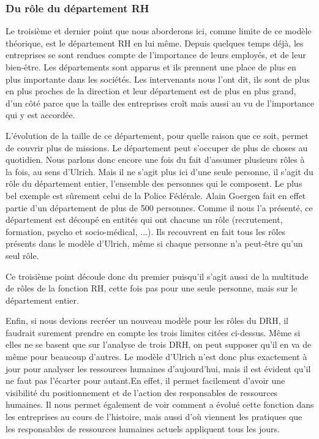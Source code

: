 \subsubsection*{Du rôle du département RH}

Le troisième et dernier point que nous aborderons ici, comme limite de ce modèle théorique, est le département RH en lui même. Depuis quelques temps déjà, les entreprises se sont rendues compte de l'importance de leurs employés, et de leur bien-être. Les départements sont apparus et ils prennent une place de plus en plus importante dans les sociétés. Les intervenants nous l'ont dit, ils sont de plus en plus proches de la direction et leur département est de plus en plus grand, d'un côté parce que la taille des entreprises croît mais aussi au vu de l'importance qui y est accordée. \newline
{}

L'évolution de la taille de ce département, pour quelle raison que ce soit, permet de couvrir plus de missions. Le département peut s'occuper de plus de choses au quotidien. Nous parlons donc encore une fois du fait d'assumer plusieurs rôles à la fois, au sens d'Ulrich. Mais il ne s'agit plus ici d'une seule personne, il s'agit du rôle du département entier, l'ensemble des personnes qui le composent. Le plus bel exemple est sûrement celui de la Police Fédérale. Alain Goergen fait en effet partie d'un département de plus de 500 personnes. Comme il nous l'a présenté, ce département est découpé en entités qui ont chacune un rôle (recrutement, formation, psycho et socio-médical, ...). Ils recouvrent en fait tous les rôles présents dans le modèle d'Ulrich, même si chaque personne n'a peut-être qu'un seul rôle. \newline

Ce troisième point découle donc du premier puisqu'il s'agit aussi de la multitude de rôles de la fonction RH, cette fois pas pour une seule personne, mais sur le département entier. \newline

Enfin, si nous devions recréer un nouveau modèle pour les rôles du DRH, il faudrait surement prendre en compte les trois limites citées ci-dessus. Même si elles ne se basent que sur l'analyse de trois DRH, on peut supposer qu'il en va de même pour beaucoup d'autres. Le modèle d'Ulrich n'est donc plus exactement à jour pour analyser les ressources humaines d'aujourd'hui, mais il est évident qu'il ne faut pas l'écarter pour autant.En effet, il permet facilement d'avoir une visibilité du positionnement et de l'action des responsables de ressources humaines. Il nous permet également de voir comment a évolué cette fonction dans les entreprises au cours de l'histoire, mais aussi d'où viennent les pratiques que les responsables de ressources humaines actuels appliquent tous les jours. \newline
